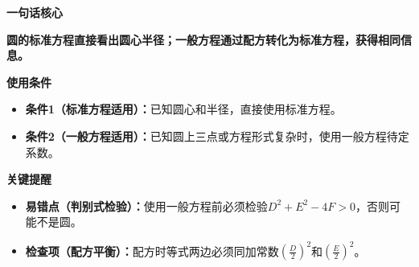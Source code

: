\begin{summarybox}
	\textbf{\textcolor{CSummary}{一句话核心}}

	\textbf{圆的标准方程直接看出圆心半径；一般方程通过配方转化为标准方程，获得相同信息。}

	\medskip
	\textbf{\textcolor{CSummary}{使用条件}}
	\begin{itemize}[leftmargin=*, itemsep=0.5em, topsep=0.4em]
		\item \textbf{条件1（标准方程适用）：}已知圆心和半径，直接使用标准方程。
		\item \textbf{条件2（一般方程适用）：}已知圆上三点或方程形式复杂时，使用一般方程待定系数。
	\end{itemize}

	\medskip
	\textbf{\textcolor{CSummary}{关键提醒}}
	\begin{itemize}[leftmargin=*, itemsep=0.5em, topsep=0.4em]
		\item \textbf{易错点（判别式检验）：}使用一般方程前必须检验$D^2+E^2-4F>0$，否则可能不是圆。
		\item \textbf{检查项（配方平衡）：}配方时等式两边必须同加常数$(\frac{D}{2})^2$和$(\frac{E}{2})^2$。
	\end{itemize}
\end{summarybox}
